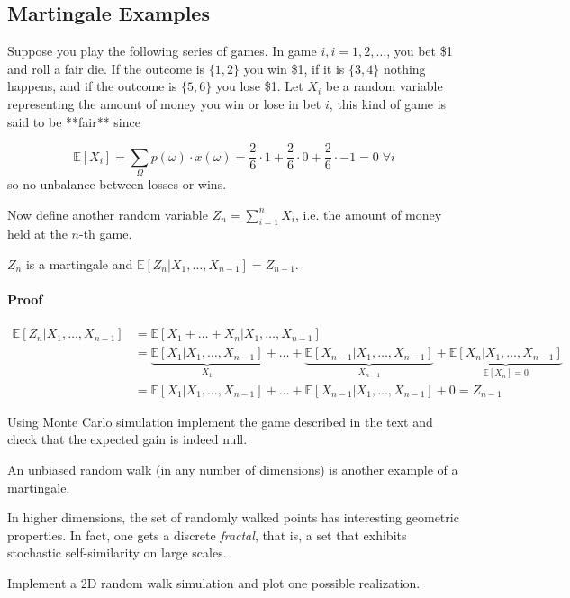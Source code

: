 \documentclass[12pt,a4paper]{article}
\begin{document}
\subsection{Martingale Examples}
Suppose you play the following series of games. In game $i, i = 1, 2,\ldots$, you bet \$1 and roll a fair die. If the outcome is $\{1,2\}$ you win \$1, if it is $\{3,4\}$ nothing happens, and if the outcome is $\{5,6\}$ you lose \$1.
Let $X_i$ be a random variable representing the amount of money you win or lose in bet $i$, this kind of game is said to be **fair** since

$$\mathbb{E}[X_i]= \sum_{\Omega}p(\omega)\cdot x(\omega) = \frac{2}{6}\cdot 1 + \frac{2}{6}\cdot 0 + \frac{2}{6}\cdot -1 = 0\;\forall i$$
so no unbalance between losses or wins.

Now define another random variable $Z_n = \sum_{i=1}^{n} X_i$, i.e. the amount of money held at the $n$-th game.

$Z_n$ is a martingale and $\mathbb{E}[Z_n|X_1,\ldots, X_{n-1}] = Z_{n-1}$.

\paragraph{Proof}

\begin{equation*}
	\begin{aligned}
		\mathbb{E}[Z_n|X_1,\ldots, X_{n-1}] &= \mathbb{E}[X_1 +\ldots + X_n|X_1,\ldots, X_{n-1}] \\
		& = \underbrace{\mathbb{E}[X_1|X_1,\ldots, X_{n-1}]}_{X_1} + \ldots + \underbrace{\mathbb{E}[X_{n-1}|X_1,\ldots, X_{n-1}]}_{X_{n-1}} + \underbrace{\mathbb{E}[X_n|X_1,\ldots, X_{n-1}]}_{\mathbb{E}[X_n]=0} \\
		& = \mathbb{E}[X_1|X_1,\ldots, X_{n-1}] + \ldots + \mathbb{E}[X_{n-1}|X_1,\ldots, X_{n-1}] + 0 = Z_{n-1}
	\end{aligned}
\end{equation*}

\begin{question}
Using Monte Carlo simulation implement the game described in the text and check that the expected gain is indeed null.
\end{question}

\begin{question}
An unbiased random walk (in any number of dimensions) is another example of a martingale.

In higher dimensions, the set of randomly walked points has interesting geometric properties. In fact, one gets a discrete \emph{fractal}, that is, a set that exhibits stochastic self-similarity on large scales.

Implement a 2D random walk simulation and plot one possible realization.
\end{question}
\end{document}
